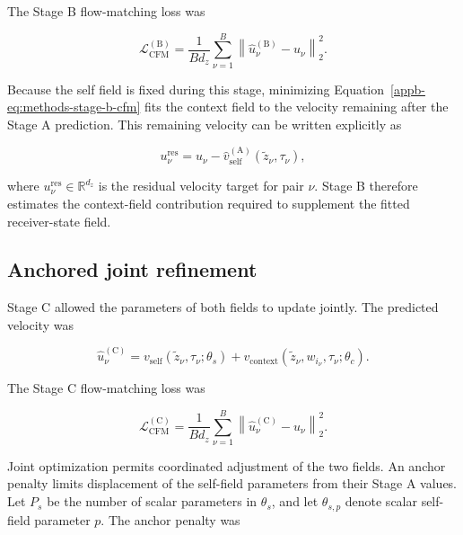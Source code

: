 The Stage B flow-matching loss was

\begin{equation}
\mathcal{L}_{\mathrm{CFM}}^{(\mathrm{B})}
=
\frac{1}{B d_z}
\sum_{\nu=1}^{B}
\left\|
\widehat{u}_\nu^{(\mathrm{B})}
-
u_\nu
\right\|_2^2.
\label{appb-eq:methods-stage-b-cfm}
\end{equation}

Because the self field is fixed during this stage, minimizing
Equation~\ref{appb-eq:methods-stage-b-cfm} fits the context field to the velocity
remaining after the Stage A prediction. This remaining velocity can be written
explicitly as

\begin{equation}
u_\nu^{\mathrm{res}}
=
u_\nu
-
\widehat{v}_{\mathrm{self}}^{(\mathrm{A})}
\left(
\widetilde{z}_\nu,
\tau_\nu
\right),
\label{appb-eq:methods-stage-b-residual-target}
\end{equation}

where \(u_\nu^{\mathrm{res}}\in\mathbb{R}^{d_z}\) is the residual velocity
target for pair \(\nu\). Stage B therefore estimates the context-field
contribution required to supplement the fitted receiver-state field.

\subsection{Anchored joint refinement}
\label{appb-sec:methods-training-stage-c}

Stage C allowed the parameters of both fields to update jointly. The predicted
velocity was

\begin{equation}
\widehat{u}_\nu^{(\mathrm{C})}
=
v_{\mathrm{self}}
\left(
\widetilde{z}_\nu,
\tau_\nu;
\theta_s
\right)
+
v_{\mathrm{context}}
\left(
\widetilde{z}_\nu,
w_{i_\nu},
\tau_\nu;
\theta_c
\right).
\label{appb-eq:methods-stage-c-prediction}
\end{equation}

The Stage C flow-matching loss was

\begin{equation}
\mathcal{L}_{\mathrm{CFM}}^{(\mathrm{C})}
=
\frac{1}{B d_z}
\sum_{\nu=1}^{B}
\left\|
\widehat{u}_\nu^{(\mathrm{C})}
-
u_\nu
\right\|_2^2.
\label{appb-eq:methods-stage-c-cfm}
\end{equation}

Joint optimization permits coordinated adjustment of the two fields. An
anchor penalty limits displacement of the self-field parameters from their
Stage A values. Let \(P_s\) be the number of scalar parameters in
\(\theta_s\), and let \(\theta_{s,p}\) denote scalar self-field parameter
\(p\). The anchor penalty was

